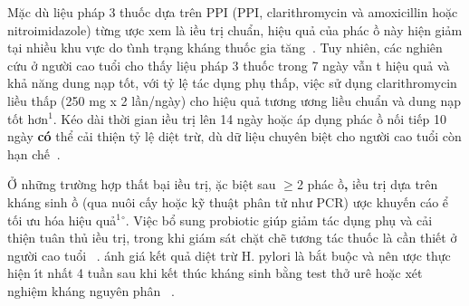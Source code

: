 \documentclass[9pt,twocolumn]{article}
\begin{document}
Mặc d\`{u} li{\^{\d{e}}}u ph\'{a}p 3 thuốc dựa tr{\^{e}}n PPI (PPI, clarithromycin v\`{a} amoxicillin hoặc nitroimidazole) từng \text{\dj}ược xem l\`{a} \text{\dj}iều tr\d{i} chuẩn, hi{\^{\d{e}}}u quả của ph\'{a}c \text{\dj}ồ n\`{a}y hi{\^{\d{e}}}n giảm t{\d{a}}i nhiều khu vực do t\`{\i}nh tr{\d{a}}ng kh\'{a}ng thuốc gia t{\u{a}}ng\unskip~\cite{2901310:34531808,2901310:34531813,2901310:34531815}\ensuremath{^{}}. Tuy nhi{\^{e}}n, c\'{a}c nghi{\^{e}}n cứu ở người cao tuổi cho thấy li{\^{\d{e}}}u ph\'{a}p 3 thuốc trong 7 ng\`{a}y vẫn t hi{\^{\d{e}}}u quả v\`{a} khả n{\u{a}}ng dung n{\d{a}}p tốt, với tỷ l{\^{\d{e}}} t\'{a}c d\d{u}ng ph\d{u} thấp, vi{\^{\d{e}}}c sử d\d{u}ng clarithromycin liều thấp (250 mg x 2 lần/ng\`{a}y) cho hi{\^{\d{e}}}u quả tương \text{\dj}ương liều chuẩn v\`{a} dung n{\d{a}}p tốt hơn\ensuremath{^1}. K{\'e}o d\`{a}i thời gian \text{\dj}iều tr\d{i} l{\^{e}}n 14 ng\`{a}y hoặc \'{a}p d\d{u}ng ph\'{a}c \text{\dj}ồ nối ti{{\'{\^{e}}}}p 10 ng\`{a}y\textbf{ c{\'{o}}} thể cải thi{\^{\d{e}}}n tỷ l{\^{\d{e}}} di{\^{\d{e}}}t trừ, d\`{u} dữ li{\^{\d{e}}}u chuy{\^{e}}n bi{\^{\d{e}}}t cho người cao tuổi c\`{o}n h{\d{a}}n ch{{\'{\^{e}}}}\unskip~\cite{2901310:34531806,2901310:34531817,2901310:34531818}\ensuremath{^{}}.

Ở những trường hợp thất b{\d{a}}i \text{\dj}iều tr\d{i}, \text{\dj}ặc bi{\^{\d{e}}}t sau \ensuremath{\geq }2 ph\'{a}c \text{\dj}ồ\textbf{, }\text{\dj}iều tr\d{i} dựa tr{\^{e}}n kh\'{a}ng sinh \text{\dj}ồ (qua nu{\^o}i cấy hoặc kỹ thu{\^{\d{a}}}t ph\^{a}n tử như PCR) \text{\dj}ược khuy{{\'{\^{e}}}}n c\'{a}o \text{\dj}ể tối ưu h{\'{o}}a hi{\^{\d{e}}}u quả\textbf{\ensuremath{^1}\ensuremath{^\circ}}. Vi{\^{\d{e}}}c bổ sung probiotic gi\'{u}p giảm t\'{a}c d\d{u}ng ph\d{u} v\`{a} cải thi{\^{\d{e}}}n tu\^{a}n thủ \text{\dj}iều tr\d{i}, trong khi gi\'{a}m s\'{a}t chặt chẽ tương t\'{a}c thuốc l\`{a} cần thi{{\'{\^{e}}}}t ở người cao tuổi\unskip~\cite{2901310:34531807,2901310:34531813,2901310:34531814,2901310:34531815} . \text{\DJ}\'{a}nh gi\'{a} k{{\'{\^{e}}}}t quả di{\^{\d{e}}}t trừ H. pylori l\`{a} bắt bu{\^{\d{o}}}c v\`{a} n{\^{e}}n \text{\dj}ược thực hi{\^{\d{e}}}n \'{\i}t nhất 4 tuần sau khi k{{\'{\^{e}}}}t th\'{u}c kh\'{a}ng sinh bằng test thở ur{\^{e}} hoặc x{\'e}t nghi{\^{\d{e}}}m kh\'{a}ng nguy{\^{e}}n ph\^{a}n\unskip~\cite{2901310:34531813} .
\end{document}
